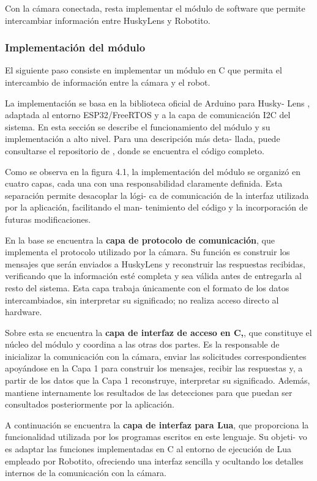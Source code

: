 \documentclass{prgrado}
\begin{document}
Con la cámara conectada, resta implementar el módulo de software que permite intercambiar información entre HuskyLens y Robotito.

\subsubsection{Implementación del módulo}

El siguiente paso consiste en implementar un módulo en C que permita el
intercambio de información entre la cámara y el robot.

La implementación se basa en la biblioteca oficial de Arduino para Husky-
Lens \cite{dfrobot2021huskylens}, adaptada al entorno ESP32/FreeRTOS y a la capa de
comunicación I2C del sistema. En esta sección se describe el funcionamiento
del módulo y su implementación a alto nivel. Para una descripción más deta-
llada, puede consultarse el repositorio de \cite{robotito2026hardware}, donde se encuentra el código completo.

Como se observa en la figura 4.1, la implementación del módulo se organizó en cuatro capas, cada una con una
responsabilidad claramente definida. Esta separación permite desacoplar la lógi-
ca de comunicación de la interfaz utilizada por la aplicación, facilitando el man-
tenimiento del código y la incorporación de futuras modificaciones.

En la base se encuentra la \textbf{capa de protocolo de comunicación}, que implementa el
protocolo utilizado por la cámara. Su función es construir los mensajes que serán
enviados a HuskyLens y reconstruir las respuestas recibidas, verificando que la
información esté completa y sea válida antes de entregarla al resto del sistema.
Esta capa trabaja únicamente con el formato de los datos intercambiados, sin
interpretar su significado; no realiza acceso directo al hardware.

Sobre esta se encuentra la \textbf{capa de interfaz de acceso en C,}, que constituye el núcleo del módulo y coordina a las otras dos partes. Es la
responsable de inicializar la comunicación con la cámara, enviar las solicitudes
correspondientes apoyándose en la Capa 1 para construir los mensajes, recibir
las respuestas y, a partir de los datos que la Capa 1 reconstruye, interpretar su
significado. Además, mantiene internamente los resultados de las detecciones
para que puedan ser consultados posteriormente por la aplicación.

A continuación se encuentra la \textbf{capa de interfaz para Lua}, que proporciona
la funcionalidad utilizada por los programas escritos en este lenguaje. Su objeti-
vo es adaptar las funciones implementadas en C al entorno de ejecución de Lua
empleado por Robotito, ofreciendo una interfaz sencilla y ocultando los detalles
internos de la comunicación con la cámara.
\end{document}
